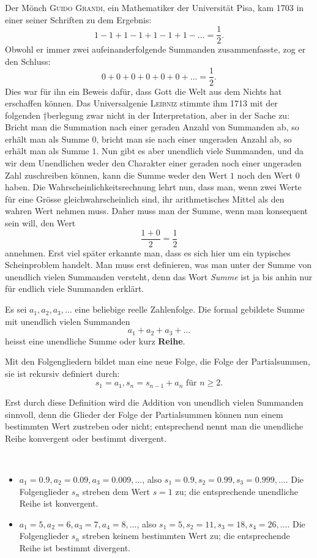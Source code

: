 \documentclass[%
11pt,%
twoside,%
titlepage,%
german,%
headsepline%
]{scrartcl}
\begin{document}
Der M\"onch \textsc{Guido Grandi}, ein Mathematiker der Universit\"at Pisa, kam 1703 in einer seiner Schriften zu dem Ergebnis:
$$1-1+1-1+1-1+1-\dots=\frac{1}{2}.$$
Obwohl er immer zwei aufeinanderfolgende Summanden zusammenfasste, zog er den Schluss:
$$0+0+0+0+0+0+\dots=\frac{1}{2}.$$
Dies war f\"ur ihn ein Beweis daf\"ur, dass Gott die Welt aus dem Nichts hat erschaffen k\"onnen. Das Universalgenie \textsc{Leibniz} stimmte ihm 1713 mit der folgenden †berlegung zwar nicht in der Interpretation, aber in der Sache zu: Bricht man die Summation nach einer geraden Anzahl von Summanden ab, so erh\"alt man als Summe $0$, bricht man sie nach einer ungeraden Anzahl ab, so erh\"alt man als Summe $1$. Nun gibt es aber unendlich viele Summanden, und da wir dem Unendlichen weder den Charakter einer geraden noch einer ungeraden Zahl zuschreiben k\"onnen, kann die Summe weder den Wert $1$ noch den Wert $0$ haben. Die Wahrscheinlichkeitsrechnung lehrt nun, dass man, wenn zwei Werte f\"ur eine Gr\"osse gleichwahrscheinlich sind, ihr arithmetisches Mittel als den wahren Wert nehmen muss. Daher muss man der Summe, wenn man konsequent sein will, den Wert
$$\frac{1+0}{2}=\frac{1}{2}$$
annehmen. Erst viel sp\"ater erkannte man, dass es sich hier um ein typisches Scheinproblem handelt. Man muss erst definieren, was man unter der Summe von unendlich vielen Summanden versteht, denn das Wort \emph{Summe} ist ja bis anhin nur f\"ur endlich viele Summanden erkl\"art.

\begin{cdef}[Reihe]{}
Es sei $a_1,a_2,a_3, \dots$ eine beliebige reelle Zahlenfolge. Die formal gebildete Summe mit unendlich vielen Summanden
$$a_1+a_2+a_3+\dots$$
heisst eine unendliche Summe oder kurz \textbf{Reihe}.
\end{cdef}
Mit den Folgengliedern bildet man eine neue Folge, die Folge der Partialsummen, sie ist rekursiv definiert durch:
$$s_1=a_1, s_n=s_{n-1}+a_n \text{ f\"ur } n\geq2.$$

Erst durch diese Definition wird die Addition von unendlich vielen Summanden sinnvoll, denn die Glieder der Folge der Partialsummen k\"onnen nun einem bestimmten Wert zustreben oder nicht; entsprechend nennt man die unendliche Reihe konvergent oder bestimmt divergent.

\begin{bsps}
\ \\[-4ex]
\begin{itemize}
\item $a_1=0.9, a_2=0.09, a_3=0.009, \dots$, also $s_1 = 0.9, s_2 = 0.99, s_3 = 0.999, \dots$. Die Folgenglieder $s_n$ streben dem Wert $s=1$ zu; die entsprechende unendliche Reihe ist konvergent.
\item $a_1=5, a_2=6, a_3=7, a_4=8, \dots$, also $s_1 = 5, s_2 = 11, s_3 = 18, s_4 = 26, \dots$. Die Folgenglieder $s_n$ streben keinem bestimmten Wert zu; die entsprechende Reihe ist bestimmt divergent.
\end{itemize}
\end{bsps}
\end{document}
